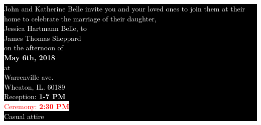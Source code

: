 \documentclass{article}
\begin{document}
\pagecolor{red!60!blue}

\vspace*{1mm}

\colorbox{black}{\begin{minipage}{0.8\textwidth}
\begin{center}
\vspace{0.2in}
\textcolor{white}{\large John and Katherine Belle invite you and your loved ones to join them at their home to celebrate the marriage of their daughter, \\ \vspace{0.1in} {\cursivefont \Large Jessica Hartmann Belle,} to \\ {\cursivefont \LARGE James Thomas Sheppard} \vspace{0.1in} \\ on the afternoon of \\ {\bf May 6th, 2018} \\ \bigskip at \\  Warrenville ave. \\ Wheaton, IL. 60189 \\ \bigskip Reception: {\bf 1-7 PM} \\
\vspace{5mm} 
\colorbox{carriage}{\colorbox{white}{\textcolor{red}{Ceremony: {\bf 2:30 PM} }}} \\ \bigskip Casual attire } 
\end{center}
\end{minipage}}
\end{document}

